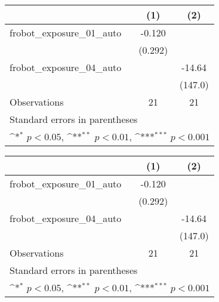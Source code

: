 {
\def\sym#1{\ifmmode^{#1}\else\(^{#1}\)\fi}
\begin{tabular}{l*{2}{c}}
\toprule
                    &\multicolumn{1}{c}{(1)}         &\multicolumn{1}{c}{(2)}         \\
\midrule
frobot\_exposure\_01\_auto&      -0.120         &                     \\
                    &     (0.292)         &                     \\
\addlinespace
frobot\_exposure\_04\_auto&                     &      -14.64         \\
                    &                     &     (147.0)         \\
\midrule
Observations        &          21         &          21         \\
\bottomrule
\multicolumn{3}{l}{\footnotesize Standard errors in parentheses}\\
\multicolumn{3}{l}{\footnotesize \sym{*} \(p<0.05\), \sym{**} \(p<0.01\), \sym{***} \(p<0.001\)}\\
\end{tabular}
}
{
\def\sym#1{\ifmmode^{#1}\else\(^{#1}\)\fi}
\begin{tabular}{l*{2}{c}}
\toprule
                    &\multicolumn{1}{c}{(1)}         &\multicolumn{1}{c}{(2)}         \\
\midrule
frobot\_exposure\_01\_auto&      -0.120         &                     \\
                    &     (0.292)         &                     \\
\addlinespace
frobot\_exposure\_04\_auto&                     &      -14.64         \\
                    &                     &     (147.0)         \\
\midrule
Observations        &          21         &          21         \\
\bottomrule
\multicolumn{3}{l}{\footnotesize Standard errors in parentheses}\\
\multicolumn{3}{l}{\footnotesize \sym{*} \(p<0.05\), \sym{**} \(p<0.01\), \sym{***} \(p<0.001\)}\\
\end{tabular}
}

